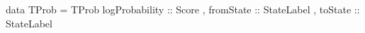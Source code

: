 data TProb = TProb { logProbability :: Score
                   , fromState :: StateLabel
                   , toState :: StateLabel
                   } 

